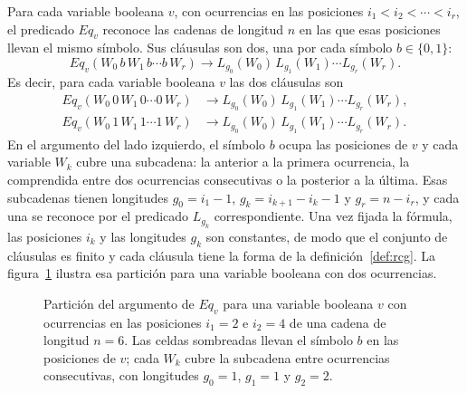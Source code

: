 Para cada variable booleana $v$, con ocurrencias en las posiciones
$i_1 < i_2 < \cdots < i_r$, el predicado $Eq_v$ reconoce las cadenas de
longitud $n$ en las que esas posiciones llevan el mismo símbolo. Sus
cláusulas son dos, una por cada símbolo $b \in \{0,1\}$:
\[
  Eq_v(W_0\, b\, W_1\, b \cdots b\, W_r) \to
  L_{g_0}(W_0)\, L_{g_1}(W_1) \cdots L_{g_r}(W_r).
\]
Es decir, para cada variable booleana $v$ las dos cláusulas son
\[
\begin{aligned}
  Eq_v(W_0\, 0\, W_1\, 0 \cdots 0\, W_r) &\to
    L_{g_0}(W_0)\, L_{g_1}(W_1) \cdots L_{g_r}(W_r), \\
  Eq_v(W_0\, 1\, W_1\, 1 \cdots 1\, W_r) &\to
    L_{g_0}(W_0)\, L_{g_1}(W_1) \cdots L_{g_r}(W_r).
\end{aligned}
\]
En el argumento del lado izquierdo, el símbolo $b$ ocupa las posiciones de
$v$ y cada variable $W_k$ cubre una subcadena: la anterior a la primera
ocurrencia, la comprendida entre dos ocurrencias consecutivas o la
posterior a la última. Esas subcadenas tienen longitudes
$g_0 = i_1 - 1$, $g_k = i_{k+1} - i_k - 1$ y $g_r = n - i_r$, y cada
una se reconoce por el predicado $L_{g_k}$ correspondiente. Una vez
fijada la fórmula, las posiciones $i_k$ y las longitudes $g_k$ son
constantes, de modo que el conjunto de cláusulas es finito y cada
cláusula tiene la forma de la definición~\ref{def:rcg}. La
figura~\ref{fig:particion-eqv} ilustra esa partición para una variable
booleana con dos ocurrencias.

\begin{figure}[ht]
\centering
{}
\caption[Partición del argumento de $Eq_v$]{Partición del argumento de $Eq_v$ para una variable booleana
$v$ con ocurrencias en las posiciones $i_1=2$ e $i_2=4$ de una cadena de
longitud $n=6$. Las celdas sombreadas llevan el símbolo $b$ en las
posiciones de $v$; cada $W_k$ cubre la subcadena entre ocurrencias
consecutivas, con longitudes $g_0=1$, $g_1=1$ y $g_2=2$.}
\label{fig:particion-eqv}
\end{figure}

